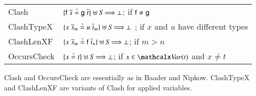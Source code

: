 

%

\jot
\noindent
\begin{tabular}{ll}
  \textsf{Clash} &   $\{ \cst{f} \; \overline{s} \unif \cst{g} \; \overline{t} \} \uplus \mathit{S} \Unifarrow \bot$; if $\mathsf{f} \not= \mathsf{g}$ \\[\jot]
  \textsf{ClashTypeX} & $\{ x \; \tuple{s}{m} \unif u \; \tuple{t}{m} \} \allowbreak \uplus \mathit{S} \Unifarrow \bot$ ; if $x$ and $u$ have different types \\[\jot]
  \textsf{ClashLenXF} & $\{ x \; \tuple{s}{m} \unif \cst{f} \; \tuple{t}{n} \} \allowbreak \uplus \mathit{S} \Unifarrow \bot$; if $m > n$ \\[\jot]
  \textsf{OccursCheck}     & $\{ x \unif t \} \uplus \mathit{S} \Unifarrow \bot$;  if $x \in \Var(t)$ and $x \not= t$
\end{tabular}
\jot

\begin{rep}\textsf{Clash} and \textsf{OccursCheck} are essentially as in
Baader and Nipkow. \textsf{ClashTypeX} and \textsf{ClashLenXF}
are variants of \textsf{Clash} for applied variables.\end{rep}

\newcommand\unifARROW[1]{\rlap{\ensuremath{\Unifarrow_{#1}\;}}\phantom{\Unifarrow_\textsf{DecomposeX}\;}}

